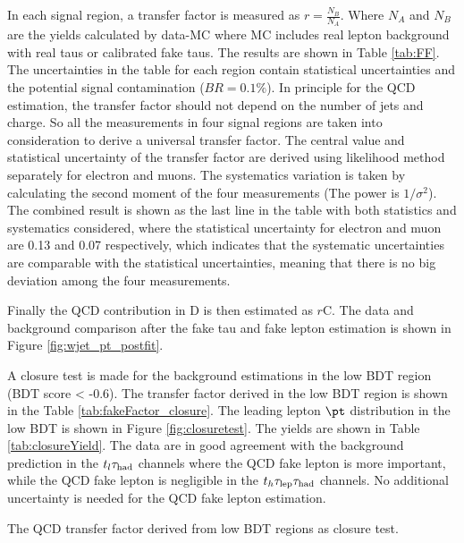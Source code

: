 In each signal region, a transfer factor is measured as $r=\frac{N_B}{N_A}$. Where $N_A$ and $N_B$ are the yields calculated by data-MC where MC includes real lepton background with real taus or calibrated fake taus. The results are shown in Table \ref{tab:FF}. The uncertainties in the table for each region contain statistical uncertainties and the potential signal contamination ($BR=0.1\%$). In principle for the QCD estimation, the transfer factor should not depend on the number of jets and charge. So all the measurements in four signal regions are taken into consideration to derive a universal transfer factor. The central value and statistical uncertainty of the transfer factor are derived using likelihood method separately for electron and muons. The systematics variation is taken by calculating the second moment of the four measurements (The power is $1/\sigma^2$). The combined result is shown as the last line in the table with both statistics and systematics considered, where the statistical uncertainty for electron and muon are 0.13 and 0.07 respectively, which indicates that the systematic uncertainties are comparable with the statistical uncertainties, meaning that there is no big deviation among the four measurements.


Finally the QCD contribution in D is then estimated as $r$C.
The data and background comparison after the fake tau and fake lepton estimation is shown in Figure \ref{fig:wjet_pt_postfit}.


A closure test is made for the background estimations in the low BDT region (BDT score < -0.6). The transfer factor derived in the low BDT region is shown in the Table \ref{tab:fakeFactor_closure}. The leading lepton $\pt$ distribution in the low BDT is shown in Figure \ref{fig:closuretest}. The yields are shown in Table \ref{tab:closureYield}. The data are in good agreement with the background prediction in the
$t_l\tau_\text{had}$ channels where the QCD fake lepton is more important, while the QCD fake lepton is negligible in the $t_h\tau_\text{lep}{}\tau_\text{had}$ channels. No additional uncertainty is needed for the QCD fake lepton estimation.    




\begin{table}
\caption{The QCD transfer factor derived from low BDT regions as closure test.}
\label{tab:fakeFactor_closure}

\end{table}

